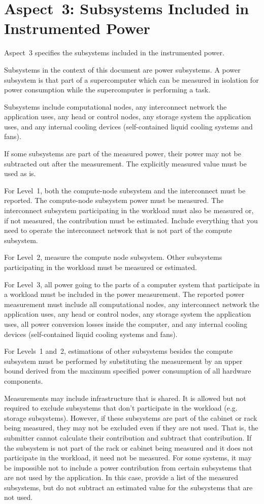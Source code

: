\section{Aspect~3: Subsystems Included in Instrumented Power}
\label{sec:A3SIiIP}

Aspect~3 specifies the subsystems included in the instrumented power.

Subsystems in the context of this document are power subsystems.
A power subsystem is that part of a supercomputer which can be measured in isolation for power consumption while the supercomputer is performing a task.

Subsystems include computational nodes, any interconnect network the application uses, any head or control nodes, any storage system the application uses, and any internal cooling devices (self-contained liquid cooling systems and fans).

If some subsystems are part of the measured power, their power may not be subtracted out after the measurement.
The explicitly measured value must be used as is.

For Level~1, both the compute-node subsystem and the interconnect must be reported.
The compute-node subsystem power must be measured.
The interconnect subsystem participating in the workload must also be measured or, if not measured, the contribution must be estimated.
Include everything that you need to operate the interconnect network that is not part of the compute subsystem.

For Level~2, measure the compute node subsystem.
Other subsystems participating in the workload must be measured or estimated.

For Level~3, all power going to the parts of a computer system that participate in a workload must be included in the power measurement.
The reported power measurement must include all computational nodes, any interconnect network the application uses, any head or control nodes, any storage system the application uses, all power conversion losses inside the computer, and any internal cooling devices (self-contained liquid cooling systems and fans).

For Levels~1 and~2, estimations of other subsystems besides the compute subsystem must be performed by substituting the measurement by an upper bound derived from the maximum specified power consumption of all hardware components.

Measurements may include infrastructure that is shared.
It is allowed but not required to exclude subsystems that don't participate in the workload (e.g. storage subsystems).
However, if these subsystems are part of the cabinet or rack being measured, they may not be excluded even if they are not used.
That is, the submitter cannot calculate their contribution and subtract that contribution.
If the subsystem is not part of the rack or cabinet being measured and it does not participate in the workload, it need not be measured.
For some systems, it may be impossible not to include a power contribution from certain subsystems that are not used by the application.
In this case, provide a list of the measured subsystems, but do not subtract an estimated value for the subsystems that are not used.

